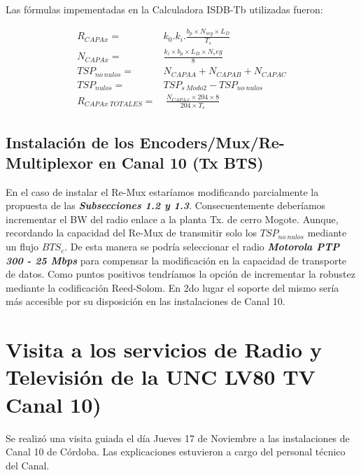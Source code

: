 \documentclass[a4paper,11pt]{article} %
\begin{document}
Las f\'ormulas impementadas en la Calculadora ISDB-Tb utilizadas fueron:

\begin{flushleft}
\begin{eqnarray}
R_{CAPAx} = & k_0 . k_i . \frac{b_p \times N_{seg} \times
L_D}{T_s} \\
N_{CAPAx} = & \frac{k_i \times b_p \times L_D \times N_seg }{8} \\
TSP_{no \ nulos} = & N_{CAPA A} + N_{CAPA
B} + N_{CAPA C} \\
TSP_{nulos} = & TSP_{s \ Modo2} - TSP_{no \ nulos}  \\
R_{CAPAx \ TOTALES } = & \ \frac{N_{CAPA \ x} \times 204 \times
8}{204 \times T_s}  
\end{eqnarray}
\end{flushleft}

\subsection{Instalaci\'on de los Encoders/Mux/Re-Multiplexor en Canal 10
(Tx BTS)}

En el caso de instalar el Re-Mux estar\'iamos modificando parcialmente
la propuesta de las \textbf{\emph{Subsecciones 1.2 y 1.3}}.
Consecuentemente deber\'iamos incrementar el BW del radio enlace a la
planta Tx. de cerro Mogote. Aunque, recordando la capacidad del Re-Mux
de transmitir solo los $TSP_{no \ nulos}$ mediante un flujo $BTS_c$. De
esta manera se podr\'ia seleccionar el radio \textbf\emph{{Motorola PTP
300 - 25 Mbps}} para compensar la modificaci\'on en la capacidad de
transporte de datos.
Como puntos positivos tendr\'iamos la opci\'on de incrementar la
robustez mediante la codificaci\'on Reed-Solom. En 2do lugar el soporte
del mismo ser\'ia m\'as accesible por su disposici\'on en las
instalaciones de Canal 10.


\newpage
\section{Visita a los servicios de Radio y Televisi\'on de la UNC
LV80 TV Canal 10)}

Se realiz\'o una visita guiada el d\'ia Jueves 17 de Noviembre a las
instalaciones de Canal 10 de Córdoba. Las explicaciones estuvieron a
cargo del personal técnico del Canal.
\\
\\
\end{document}
